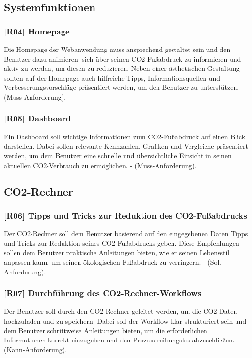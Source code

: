 \subsection{Systemfunktionen}

\subsubsection{[R04] Homepage}

Die Homepage der Webanwendung muss ansprechend gestaltet sein und den Benutzer dazu animieren, sich über seinen CO2-Fußabdruck zu informieren und aktiv zu werden, um diesen zu reduzieren. Neben einer ästhetischen Gestaltung sollten auf der Homepage auch hilfreiche Tipps, Informationsquellen und Verbesserungsvorschläge präsentiert werden, um den Benutzer zu unterstützen. - (Muss-Anforderung).

\subsubsection{[R05] Dashboard}

Ein Dashboard soll wichtige Informationen zum CO2-Fußabdruck auf einen Blick darstellen. Dabei sollen relevante Kennzahlen, Grafiken und Vergleiche präsentiert werden, um dem Benutzer eine schnelle und übersichtliche Einsicht in seinen aktuellen CO2-Verbrauch zu ermöglichen. - (Muss-Anforderung).

\subsection{CO2-Rechner}

\subsubsection{[R06] Tipps und Tricks zur Reduktion des CO2-Fußabdrucks}

Der CO2-Rechner soll dem Benutzer basierend auf den eingegebenen Daten Tipps und Tricks zur Reduktion seines CO2-Fußabdrucks geben.
Diese Empfehlungen sollen dem Benutzer praktische Anleitungen bieten, wie er seinen Lebensstil anpassen kann, um seinen ökologischen Fußabdruck zu verringern. - (Soll-Anforderung).

\subsubsection{[R07] Durchführung des CO2-Rechner-Workflows}

Der Benutzer soll durch den CO2-Rechner geleitet werden, um die CO2-Daten hochzuladen und zu speichern. Dabei soll der Workflow klar strukturiert sein und dem Benutzer schrittweise Anleitungen bieten, um die erforderlichen Informationen korrekt einzugeben und den Prozess reibungslos abzuschließen. - (Kann-Anforderung).


